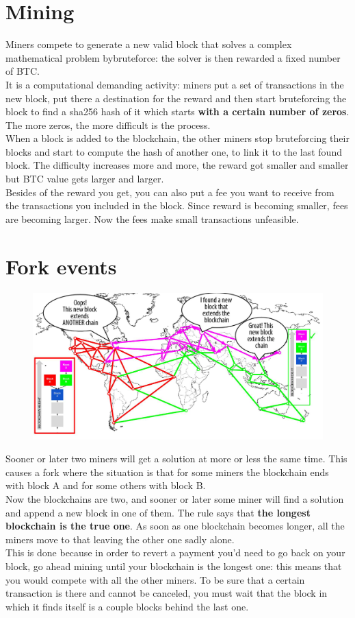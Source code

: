     \section{Mining}
        Miners compete to generate a new valid block that solves a complex mathematical problem bybruteforce: the solver is then rewarded a fixed number of BTC.\\
        It is a computational demanding activity: miners put a set of transactions in the new block, put there a destination for the reward and then start bruteforcing the block to find a sha256 hash of it which starts \textbf{with a certain number of zeros}. The more zeros, the more difficult is the process.\\
        When a block is added to the blockchain, the other miners stop bruteforcing their blocks and start to compute the hash of another one, to link it to the last found block.
        The difficulty increases more and more, the reward got smaller and smaller but BTC value gets larger and larger.\\
        Besides of the reward you get, you can also put a fee you want to receive from the transactions you included in the block. Since reward is becoming smaller, fees are becoming larger. Now the fees make small transactions unfeasible.
\newpage    
    \section{Fork events}
        \begin{figure}[ht!]
            \centering
            \includegraphics[width=0.6\linewidth]{fork.png}
        \end{figure}
        Sooner or later two miners will get a solution at more or less the same time. This causes a fork where the situation is that for some miners the blockchain ends with block A and for some others with block B.\\
        Now the blockchains are two, and sooner or later some miner will find a solution and append a new block in one of them. The rule says that \textbf{the longest blockchain is the true one}. As soon as one blockchain becomes longer, all the miners move to that leaving the other one sadly alone.\\
        This is done because in order to revert a payment you'd need to go back on your block, go ahead mining until your blockchain is the longest one: this means that you would compete with all the other miners. 
        To be sure that a certain transaction is there and cannot be canceled, you must wait that the block in which it finds itself is a couple blocks behind the last one.    